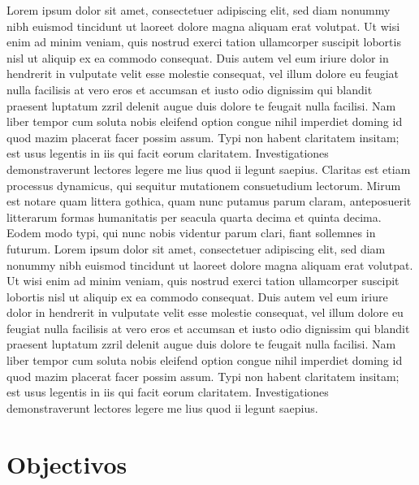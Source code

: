 Lorem  ipsum dolor sit amet, consectetuer adipiscing elit, sed diam nonummy nibh euismod tincidunt ut laoreet dolore magna aliquam erat volutpat. Ut wisi enim ad minim veniam, quis nostrud exerci tation ullamcorper suscipit lobortis nisl ut aliquip ex ea commodo consequat. Duis autem vel eum iriure dolor in hendrerit in vulputate velit esse molestie consequat, vel illum dolore eu feugiat nulla facilisis at vero eros et accumsan et iusto odio dignissim qui blandit praesent luptatum zzril delenit augue duis dolore te feugait nulla facilisi. Nam liber tempor cum soluta nobis eleifend option congue nihil imperdiet doming id quod mazim placerat facer possim assum. Typi non habent claritatem insitam; est usus legentis in iis qui facit eorum claritatem. Investigationes demonstraverunt lectores legere me lius quod ii legunt saepius. Claritas est etiam processus dynamicus, qui sequitur mutationem consuetudium lectorum. Mirum est notare quam littera gothica, quam nunc putamus parum claram, anteposuerit litterarum formas humanitatis per seacula quarta decima et quinta decima. Eodem modo typi, qui nunc nobis videntur parum clari, fiant sollemnes in futurum. Lorem ipsum dolor sit amet, consectetuer adipiscing elit, sed diam nonummy nibh euismod tincidunt ut laoreet dolore magna aliquam erat volutpat. Ut wisi enim ad minim veniam, quis nostrud exerci tation ullamcorper suscipit lobortis nisl ut aliquip ex ea commodo consequat. Duis autem vel eum iriure dolor in hendrerit in vulputate velit esse molestie consequat, vel illum dolore eu feugiat nulla facilisis at vero eros et accumsan et iusto odio dignissim qui blandit praesent luptatum zzril delenit augue duis dolore te feugait nulla facilisi. Nam liber tempor cum soluta nobis eleifend option congue nihil imperdiet doming id quod mazim placerat facer possim assum. Typi non habent claritatem insitam; est usus legentis in iis qui facit eorum claritatem. Investigationes demonstraverunt lectores legere me lius quod ii legunt saepius.

\section{Objectivos}

